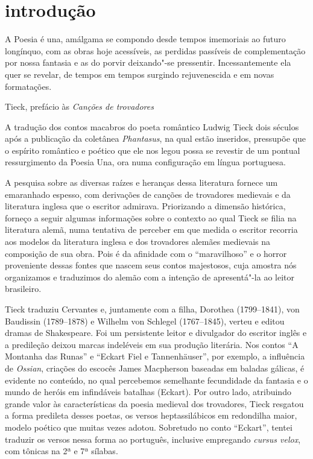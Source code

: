 
\chapter[Introdução, por Maria Aparecida Barbosa]{introdução}

\epigraph{A Poesia é una, amálgama se compondo desde tempos imemoriais
ao futuro longínquo, com as obras hoje acessíveis, as perdidas passíveis
de complementação por nossa fantasia e as do porvir deixando"-se pressentir. 
Incessantemente ela quer se revelar, de tempos em tempos surgindo rejuvenescida 
e em novas formatações.}{Tieck, prefácio às \textit{Canções de trovadores}}

A tradução dos contos macabros do poeta romântico Ludwig Tieck dois
séculos após a publicação da coletânea \textit{Phantasus}, na qual estão
inseridos, pressupõe que o espírito romântico e poético que ele nos 
legou possa se revestir de um pontual ressurgimento da
Poesia Una, ora numa configuração em língua portuguesa. 

A pesquisa sobre as diversas raízes e heranças dessa literatura fornece
um emaranhado espesso, com derivações de canções de trovadores
medievais e da literatura inglesa que o escritor admirava. Priorizando
a dimensão histórica, forneço a seguir algumas informações sobre o
contexto ao qual Tieck se filia na literatura alemã, numa
tentativa de perceber em que medida o escritor recorria aos modelos da
literatura inglesa e dos trovadores alemães medievais na composição de
sua obra. Pois é da afinidade com o ``maravilhoso'' e o horror
proveniente dessas fontes que nascem seus contos majestosos, cuja
amostra nós organizamos e traduzimos do alemão com a intenção de
apresentá"-la ao leitor brasileiro. 

Tieck traduziu Cervantes e, juntamente com a filha, Dorothea (1799--1841), 
von Baudissin (1789--1878) e Wilhelm von Schlegel (1767--1845), 
verteu e editou dramas de Shakespeare. Foi um persistente leitor e
divulgador do escritor inglês e a predileção deixou marcas indeléveis
em sua produção literária. Nos contos ``A Montanha das Runas'' e ``Eckart
Fiel e Tannenhäuser'', por exemplo, a influência de \textit{Ossian},
criações do escocês James Macpherson baseadas em baladas gálicas, é
evidente no conteúdo, no qual percebemos semelhante fecundidade da
fantasia e o mundo de heróis em infindáveis batalhas (Eckart). Por
outro lado, atribuindo grande valor às características da poesia
medieval dos trovadores, Tieck resgatou a forma predileta desses poetas,
os versos heptassilábicos em redondilha maior, modelo poético que
muitas vezes adotou. Sobretudo no conto ``Eckart'', tentei traduzir 
os versos nessa forma ao português, inclusive
empregando \textit{cursus velox}, com tônicas na 2ª e 7ª sílabas.

